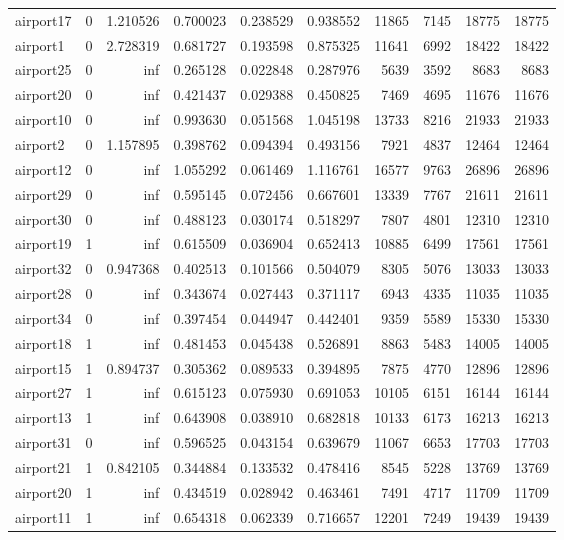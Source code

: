 \begin{longtable}{|l|r|r|r|r|r|r|r|r|r|}
airport17 & 0 & 1.210526 & 0.700023 & 0.238529 & 0.938552 & 11865 & 7145 & 18775 & 18775 \\
airport1 & 0 & 2.728319 & 0.681727 & 0.193598 & 0.875325 & 11641 & 6992 & 18422 & 18422 \\
airport25 & 0 & inf & 0.265128 & 0.022848 & 0.287976 & 5639 & 3592 & 8683 & 8683 \\
airport20 & 0 & inf & 0.421437 & 0.029388 & 0.450825 & 7469 & 4695 & 11676 & 11676 \\
airport10 & 0 & inf & 0.993630 & 0.051568 & 1.045198 & 13733 & 8216 & 21933 & 21933 \\
airport2 & 0 & 1.157895 & 0.398762 & 0.094394 & 0.493156 & 7921 & 4837 & 12464 & 12464 \\
airport12 & 0 & inf & 1.055292 & 0.061469 & 1.116761 & 16577 & 9763 & 26896 & 26896 \\
airport29 & 0 & inf & 0.595145 & 0.072456 & 0.667601 & 13339 & 7767 & 21611 & 21611 \\
airport30 & 0 & inf & 0.488123 & 0.030174 & 0.518297 & 7807 & 4801 & 12310 & 12310 \\
airport19 & 1 & inf & 0.615509 & 0.036904 & 0.652413 & 10885 & 6499 & 17561 & 17561 \\
airport32 & 0 & 0.947368 & 0.402513 & 0.101566 & 0.504079 & 8305 & 5076 & 13033 & 13033 \\
airport28 & 0 & inf & 0.343674 & 0.027443 & 0.371117 & 6943 & 4335 & 11035 & 11035 \\
airport34 & 0 & inf & 0.397454 & 0.044947 & 0.442401 & 9359 & 5589 & 15330 & 15330 \\
airport18 & 1 & inf & 0.481453 & 0.045438 & 0.526891 & 8863 & 5483 & 14005 & 14005 \\
airport15 & 1 & 0.894737 & 0.305362 & 0.089533 & 0.394895 & 7875 & 4770 & 12896 & 12896 \\
airport27 & 1 & inf & 0.615123 & 0.075930 & 0.691053 & 10105 & 6151 & 16144 & 16144 \\
airport13 & 1 & inf & 0.643908 & 0.038910 & 0.682818 & 10133 & 6173 & 16213 & 16213 \\
airport31 & 0 & inf & 0.596525 & 0.043154 & 0.639679 & 11067 & 6653 & 17703 & 17703 \\
airport21 & 1 & 0.842105 & 0.344884 & 0.133532 & 0.478416 & 8545 & 5228 & 13769 & 13769 \\
airport20 & 1 & inf & 0.434519 & 0.028942 & 0.463461 & 7491 & 4717 & 11709 & 11709 \\
airport11 & 1 & inf & 0.654318 & 0.062339 & 0.716657 & 12201 & 7249 & 19439 & 19439 \\

\end{longtable}
